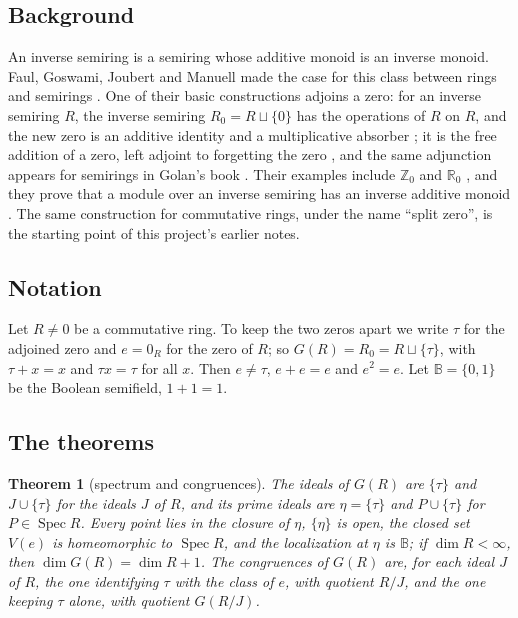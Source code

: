 \documentclass[11pt]{amsart}
\newtheorem{theorem}{Theorem}
\theoremstyle{remark}
\newcommand{\B}{\mathbb B}
\DeclareMathOperator{\Spec}{Spec}
\begin{document}
\subsection{Background}
An inverse semiring is a semiring whose additive monoid is an inverse monoid. Faul, Goswami, Joubert and Manuell made the case for this class between rings and semirings \cite{FGJM}. One of their basic constructions adjoins a zero: for an inverse semiring $R$, the inverse semiring $R_0=R\sqcup\{0\}$ has the operations of $R$ on $R$, and the new zero is an additive identity and a multiplicative absorber \cite[Definition 3.6]{FGJM}; it is the free addition of a zero, left adjoint to forgetting the zero \cite[\S3.1]{FGJM}, and the same adjunction appears for semirings in Golan's book \cite{Golan}. Their examples include $\mathbb Z_0$ and $\mathbb R_0$ \cite[Example 3.7]{FGJM}, and they prove that a module over an inverse semiring has an inverse additive monoid \cite[Proposition 6.1]{FGJM}. The same construction for commutative rings, under the name ``split zero'', is the starting point of this project's earlier notes.

\subsection{Notation}
Let $R\ne0$ be a commutative ring. To keep the two zeros apart we write $\tau$ for the adjoined zero and $e=0_R$ for the zero of $R$; so $G(R)=R_0=R\sqcup\{\tau\}$, with $\tau+x=x$ and $\tau x=\tau$ for all $x$. Then $e\ne\tau$, $e+e=e$ and $e^2=e$. Let $\B=\{0,1\}$ be the Boolean semifield, $1+1=1$.

\subsection{The theorems}

\begin{theorem}[spectrum and congruences]\label{thm:spec}
The ideals of $G(R)$ are $\{\tau\}$ and $J\cup\{\tau\}$ for the ideals $J$ of $R$, and its prime ideals are $\eta=\{\tau\}$ and $P\cup\{\tau\}$ for $P\in\Spec R$. Every point lies in the closure of $\eta$, $\{\eta\}$ is open, the closed set $V(e)$ is homeomorphic to $\Spec R$, and the localization at $\eta$ is $\B$; if $\dim R<\infty$, then $\dim G(R)=\dim R+1$. The congruences of $G(R)$ are, for each ideal $J$ of $R$, the one identifying $\tau$ with the class of $e$, with quotient $R/J$, and the one keeping $\tau$ alone, with quotient $G(R/J)$.
\end{theorem}
\end{document}

